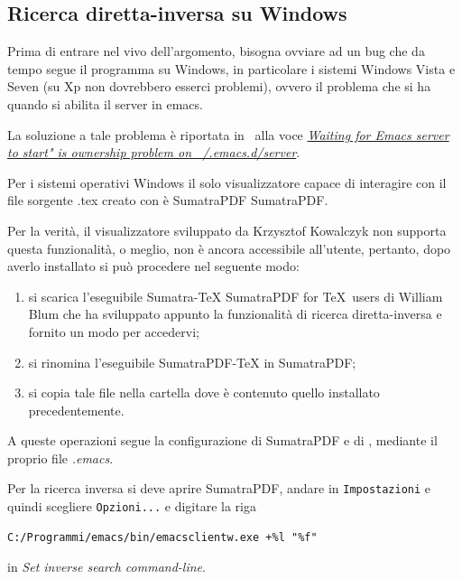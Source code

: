 \documentclass[11pt,a4paper]{article}
\begin{document}
\subsection{Ricerca diretta-inversa su Windows}
\label{sec:fiswin}
Prima di entrare nel vivo dell'argomento, bisogna ovviare ad un bug
che da tempo segue il programma \emacs{} su Windows, in particolare i
sistemi Windows Vista e Seven (su Xp non dovrebbero esserci problemi),
ovvero il problema che si ha quando si abilita il server in
emacs. %

La soluzione a tale problema è riportata in~\parencite{emacsW32:wiki}
alla voce
\href{http://www.emacswiki.org/emacs/EmacsW32#toc49}{\emph{Waiting for
    Emacs server to start" is ownership problem on
    ~/.emacs.d/server}}.

Per i sistemi operativi Windows il solo visualizzatore capace di
interagire con il file sorgente \textsf{.tex} creato con \emacs{} è
SumatraPDF %
%
{SumatraPDF}.

Per la verità, il visualizzatore sviluppato da Krzysztof Kowalczyk non
supporta questa funzionalità, o meglio, non è ancora accessibile
all'utente, pertanto, dopo averlo installato si può procedere nel
seguente modo:
\begin{enumerate}
\item si scarica l'eseguibile Sumatra-\TeX{} %
%
     {SumatraPDF for \TeX\ users}
di William Blum che ha sviluppato appunto la funzionalità di ricerca
diretta-inversa e fornito un modo per accedervi;
\item si rinomina l'eseguibile SumatraPDF-TeX in SumatraPDF;
\item si copia tale file nella cartella dove è contenuto quello
  installato precedentemente.
\end{enumerate}

A queste operazioni segue la configurazione di SumatraPDF e di \emacs,
mediante il proprio file \emph{.emacs}.

Per la ricerca inversa si deve aprire SumatraPDF, andare in
\texttt{Impostazioni} e quindi scegliere \texttt{Opzioni...} e
digitare la riga
\begin{Verbatim}
C:/Programmi/emacs/bin/emacsclientw.exe +%l "%f"
\end{Verbatim}
in \emph{Set inverse search command-line}.
\end{document}
